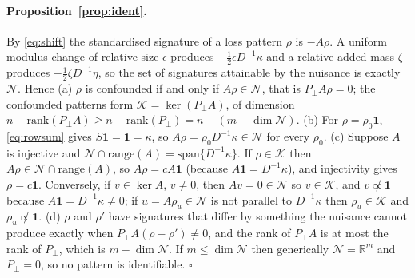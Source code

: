 \documentclass[12pt,a4paper]{article}
\newcommand{\rev}[1]{#1}
\newcommand{\rev}[1]{{\color{revcol}#1}}
\newcommand{\R}{\mathbb{R}}
\begin{document}
\paragraph{Proposition~\ref{prop:ident}.}
By \eqref{eq:shift} the standardised signature of a loss pattern $\rho$ is $-A\rho$. A uniform modulus change of relative size $\epsilon$ produces $-\tfrac12\epsilon D^{-1}\kappa$ and a relative added mass $\zeta$ produces $-\tfrac12\zeta D^{-1}\eta$, so the set of signatures attainable by the nuisance is exactly $\mathcal{N}$. Hence \rev{(a)} $\rho$ is confounded if and only if $A\rho\in\mathcal{N}$, that is $P_\perp A\rho=0$; the confounded patterns form $\mathcal K=\ker(P_\perp A)$, of dimension $n-\mathrm{rank}(P_\perp A)\ge n-\mathrm{rank}(P_\perp)=n-(m-\dim\mathcal N)$. \rev{(b)} For $\rho=\rho_0\mathbf{1}$, \eqref{eq:rowsum} gives $S\mathbf{1}=\mathbf{1}=\kappa$, so $A\rho=\rho_0D^{-1}\kappa\in\mathcal{N}$ for every $\rho_0$. \rev{(c) Suppose $A$ is injective and $\mathcal N\cap\mathrm{range}(A)=\mathrm{span}\{D^{-1}\kappa\}$. If $\rho\in\mathcal K$ then $A\rho\in\mathcal N\cap\mathrm{range}(A)$, so $A\rho=cA\mathbf 1$ (because $A\mathbf1=D^{-1}\kappa$), and injectivity gives $\rho=c\mathbf1$. Conversely, if $v\in\ker A$, $v\ne0$, then $Av=0\in\mathcal N$ so $v\in\mathcal K$, and $v\not\propto\mathbf1$ because $A\mathbf1=D^{-1}\kappa\ne0$; if $u=A\rho_u\in\mathcal N$ is not parallel to $D^{-1}\kappa$ then $\rho_u\in\mathcal K$ and $\rho_u\not\propto\mathbf1$. (d) $\rho$ and $\rho'$ have signatures that differ by something the nuisance cannot produce exactly when $P_\perp A(\rho-\rho')\ne0$, and the rank of $P_\perp A$ is at most the rank of $P_\perp$, which is $m-\dim\mathcal N$.} If $m\le\dim\mathcal{N}$ then generically $\mathcal{N}=\R^m$ and $P_\perp=0$, so no pattern is identifiable. \hfill$\square$
\end{document}

